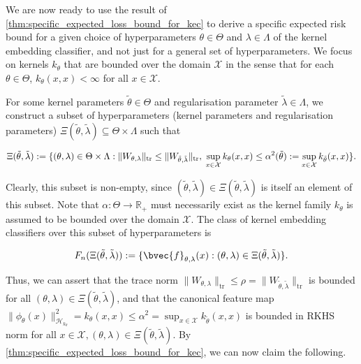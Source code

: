\documentclass{article}
\numberwithin{equation}{section}
\numberwithin{table}{section}
\numberwithin{algorithm}{section}
\begin{document}
		We are now ready to use the result of \cref{thm:specific_expected_loss_bound_for_kec} to derive a specific expected risk bound for a given choice of hyperparameters $\theta \in \Theta$ and $\lambda \in \Lambda$ of the kernel embedding classifier, and not just for a general set of hyperparameters. We focus on kernels $k_{\theta}$ that are bounded over the domain $\mathcal{X}$ in the sense that for each $\theta \in \Theta$, $k_{\theta}(x, x) < \infty$ for all $x \in \mathcal{X}$.
		
		For some kernel parameters $\tilde{\theta} \in \Theta$ and regularisation parameter $\tilde{\lambda} \in \Lambda$, we construct a subset of hyperparameters (kernel parameters and regularisation parameters) $\Xi(\tilde{\theta}, \tilde{\lambda}) \subseteq \Theta \times \Lambda$ such that

		\begin{equation}
			\Xi(\tilde{\theta}, \tilde{\lambda}) := \{ (\theta, \lambda) \in \Theta \times \Lambda : \| W_{\theta, \lambda} \|_{\mathrm{tr}} \leq \| W_{\tilde{\theta}, \tilde{\lambda}} \|_{\mathrm{tr}}, \; \sup_{x \in \mathcal{X}} k_{\theta}(x, x) \leq \alpha^{2}(\tilde{\theta}) := \sup_{x \in \mathcal{X}} k_{\tilde{\theta}}(x, x) \}. \\
			\label{eq:hyperparameter_subset_definition}
		\end{equation}
		
		Clearly, this subset is non-empty, since $(\tilde{\theta}, \tilde{\lambda}) \in \Xi(\tilde{\theta}, \tilde{\lambda})$ is itself an element of this subset. Note that $\alpha : \Theta \to \mathbb{R}_{+}$ must necessarily exist as the kernel family $k_{\theta}$ is assumed to be bounded over the domain $\mathcal{X}$. The class of kernel embedding classifiers over this subset of hyperparameters is 
		
		\begin{equation}
			F_{n}(\Xi(\tilde{\theta}, \tilde{\lambda})) := \{\bvec{f}_{\theta, \lambda}(x) : (\theta, \lambda) \in \Xi(\tilde{\theta}, \tilde{\lambda}) \}.
		\end{equation}
		
		Thus, we can assert that the trace norm $\| W_{\theta, \lambda} \|_{\mathrm{tr}} \leq \rho = \| W_{\tilde{\theta}, \tilde{\lambda}} \|_{\mathrm{tr}}$ is bounded for all $(\theta, \lambda) \in \Xi(\tilde{\theta}, \tilde{\lambda})$, and that the canonical feature map $\| \phi_{\theta}(x) \|_{\mathcal{H}_{k_{\theta}}}^{2} = k_{\theta}(x, x) \leq \alpha^{2} = \sup_{x \in \mathcal{X}} k_{\tilde{\theta}}(x, x)$ is bounded in RKHS norm for all $x \in \mathcal{X}, (\theta, \lambda) \in \Xi(\tilde{\theta}, \tilde{\lambda})$. By \cref{thm:specific_expected_loss_bound_for_kec}, we can now claim the following.
\end{document}
